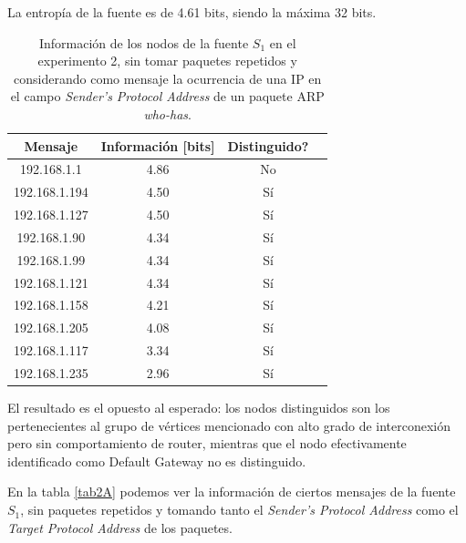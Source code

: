\par La entropía de la fuente es de 4.61 bits, siendo la máxima 32 bits. 

\begin{table}[t]
    \centering
    \begin{tabular}{ | c | c | c | l |}
        \hline
        Mensaje & Información [bits] & Distinguido?\\
        \hline
192.168.1.1 & 4.86 & No \\
\hline
192.168.1.194 & 4.50 & Sí \\
\hline
192.168.1.127 & 4.50 & Sí \\
\hline
192.168.1.90 & 4.34 & Sí \\
\hline
192.168.1.99 & 4.34 & Sí \\
\hline
192.168.1.121 & 4.34 & Sí \\
\hline
192.168.1.158 & 4.21 & Sí \\
\hline
192.168.1.205 & 4.08 & Sí \\
\hline
192.168.1.117 & 3.34 & Sí \\
\hline
192.168.1.235 & 2.96 & Sí \\
\hline
    \end{tabular} 
    \caption{Información de los nodos de la fuente $S_1$ en el experimento 2, sin tomar paquetes repetidos y considerando como mensaje la ocurrencia de una IP en el campo \textit{Sender's Protocol Address} de un paquete ARP \textit{who-has}.}
    \label{tab2SinRSinA}
\end{table} 

\par El resultado es el opuesto al esperado: los nodos distinguidos son los pertenecientes al grupo de vértices mencionado con alto grado de interconexión pero sin comportamiento de router, mientras que el nodo efectivamente identificado como Default Gateway no es distinguido.

\par En la tabla \ref{tab2A} podemos ver la información de ciertos mensajes de la fuente $S_1$, sin paquetes repetidos y tomando tanto el \textit{Sender's Protocol Address} como el \textit{Target Protocol Address} de los paquetes.

